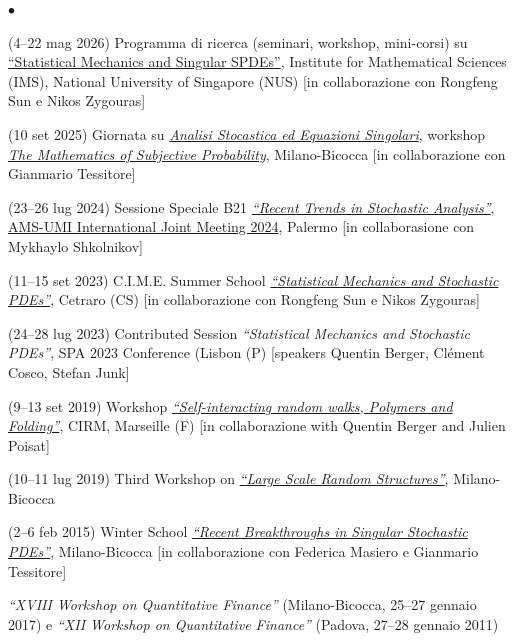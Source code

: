 \documentclass[a4paper,11pt,oneside]{amsart}
\newenvironment{myitemize}{%
\begin{list}{$\bullet$}%
 	{%
	\setlength{\itemsep}{0.3em}%
	\setlength{\topsep}{0.3em}%
	\setlength{\partopsep}{0em}%
	\setlength{\parsep}{0em}%
	\setlength{\parskip}{0em}%
	\setlength\leftmargin{1.5em}%
	\setlength\labelwidth{1.1em}%
	\setlength{\labelsep}{0.4em}%
	}%
	}%
{\end{list}}
\renewenvironment{itemize}{
\begin{myitemize}}%
{\end{myitemize}}
\begin{document}
\begin{itemize}
\item (4–22 mag 2026) Programma di ricerca (seminari, workshop, mini-corsi) su \href{https://ims.nus.edu.sg/events/statistics_singularspdes/}{``Statistical Mechanics and Singular SPDEs''}, Institute for Mathematical Sciences (IMS), National University of Singapore (NUS) [in collaborazione con Rongfeng Sun e Nikos Zygouras]

\item (10 set 2025) Giornata su \href{https://fcaraven.github.io/bicocca2025/index.html}{\emph{Analisi Stocastica ed Equazioni Singolari}}, workshop
\href{https://www.msp2023.campus.unimib.it/home}{\emph{The Mathematics of Subjective Probability}}, Milano-Bicocca
[in collaborazione con Gianmario Tessitore]

\item (23--26 lug 2024) Sessione Speciale B21 \href{https://umi.dm.unibo.it/jm-umi-ams/index.php?gf-download=2024\%2F07\%2FFile-B-Example_B211.pdf&form-id=4&field-id=9&hash=148b5b5643cc04d7e55b9fd059f9abf5ea2621f856c56cff7d19e467b68fd82e}{\emph{``Recent Trends in Stochastic Analysis''}},
\href{https://umi.dm.unibo.it/jm-umi-ams/special-sessions/special-sessions-on-25-26-july-2024/}{AMS-UMI International Joint Meeting 2024}, Palermo 
[in collaborasione con Mykhaylo Shkolnikov]

\item (11--15 set 2023) C.I.M.E. Summer School \href{https://fcaraven.github.io/cetraro2023/index.html}{\emph{``Statistical Mechanics and Stochastic PDEs''}}, Cetraro (CS)
[in collaborazione con Rongfeng Sun e Nikos Zygouras]

\item (24--28 lug 2023) Contributed Session \emph{``Statistical Mechanics and Stochastic PDEs''}, SPA 2023 Conference (Lisbon (P) [speakers Quentin Berger, Clément Cosco, Stefan Junk]

\item (9--13 set 2019) Workshop
\href{https://conferences.cirm-math.fr/2118.html}{\emph{``Self-interacting random walks, Polymers and Folding''}},
CIRM, Marseille (F)
[in collaborazione with Quentin Berger and Julien Poisat]

\item (10--11 lug 2019)
Third Workshop on \href{https://fcaraven.github.io/prin2015/workshop-2019/index.html}{\emph{``Large Scale Random Structures''}}, Milano-Bicocca

\item (2--6 feb 2015) Winter School
\href{https://fcaraven.github.io/spdes2015/index.html}{\emph{``Recent Breakthroughs in Singular Stochastic PDEs''}}, Milano-Bicocca
[in collaborazione con Federica Masiero e Gianmario Tessitore]

\item 
\emph{``XVIII Workshop on Quantitative Finance''} (Milano-Bicocca, 25--27 gennaio 2017)
e
\emph{``XII Workshop on Quantitative Finance''} (Padova, 27--28 gennaio 2011)
\end{itemize}
\end{document}
